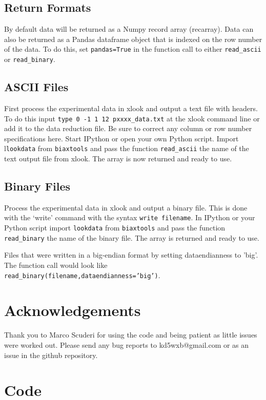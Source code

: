 \subsection{Return Formats}
By default data will be returned as a Numpy record array (recarray).  Data can also be returned as a Pandas dataframe object that is indexed on the row number of the data.  To do this, set \texttt{pandas=True} in the function call to either \texttt{read\_ascii} or \texttt{read\_binary}.

\subsection{ASCII Files}
First process the experimental data in xlook and output a text file with headers.  To do this input \texttt{type 0 -1 1 12 pxxxx\_data.txt} at the xlook command line or add it to the data reduction file.  Be sure to correct any column or row number specifications here.  Start IPython or open your own Python script.  Import l\texttt{lookdata} from \texttt{biaxtools} and pass the function \texttt{read\_ascii} the name of the text output file from xlook.  The array is now returned and ready to use.  


\subsection{Binary Files}
Process the experimental data in xlook and output a binary file.  This is done with the `write' command with the syntax \texttt{write filename}.  In IPython or your Python script import \texttt{lookdata} from \texttt{biaxtools} and pass the function \texttt{read\_binary} the name of the binary file.  The array is returned and ready to use.

Files that were written in a big-endian format by setting dataendianness to 'big'.  The function call would look like \texttt{read\_binary(filename,dataendianness='big')}.

\section{Acknowledgements}
Thank you to Marco Scuderi for using the code and being patient as little issues were worked out.  Please send any bug reports to kd5wxb@gmail.com or as an issue in the github repository.

\newpage

\section{Code}

